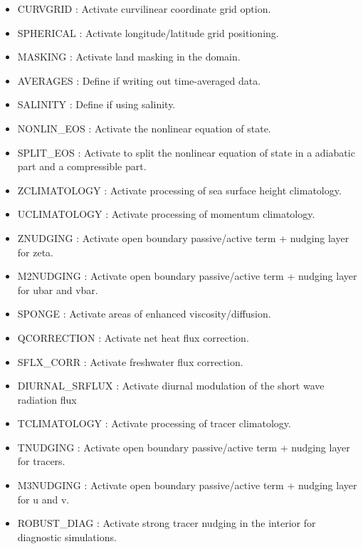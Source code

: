 \begin{itemize}
\item CURVGRID : Activate curvilinear coordinate grid option.
\item SPHERICAL : Activate longitude/latitude grid positioning.
\item MASKING : Activate land masking in the domain.
\item AVERAGES : Define if writing out time-averaged data.
\item SALINITY : Define if using salinity.
\item NONLIN\_EOS : Activate the nonlinear equation of state.
\item SPLIT\_EOS : Activate to split the nonlinear equation of state in a
adiabatic part and a compressible part.

\item ZCLIMATOLOGY : Activate processing of  sea surface height climatology.
\item UCLIMATOLOGY : Activate processing of  momentum climatology.
\item ZNUDGING : Activate open boundary passive/active term + nudging layer for zeta.
\item M2NUDGING : Activate open boundary passive/active term + nudging layer for ubar and vbar.
\item SPONGE : Activate areas of enhanced viscosity/diffusion.

\item QCORRECTION : Activate net heat flux correction.
\item SFLX\_CORR : Activate freshwater flux correction.
\item DIURNAL\_SRFLUX : Activate diurnal modulation of the short wave radiation flux
\item TCLIMATOLOGY : Activate processing of tracer climatology.
\item TNUDGING : Activate open boundary passive/active term + nudging layer for tracers.
\item M3NUDGING : Activate open boundary passive/active term + nudging layer for u and v.
\item ROBUST\_DIAG : Activate strong tracer nudging in the interior for diagnostic 
simulations.


\end{itemize}

